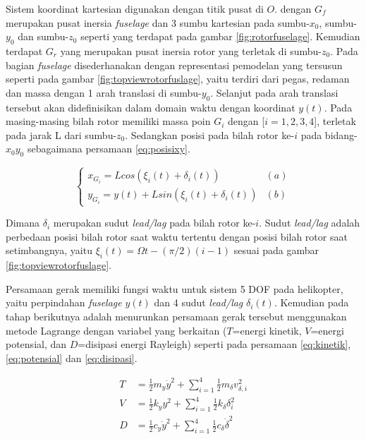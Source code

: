 Sistem koordinat kartesian digunakan dengan titik pusat di $O$. dengan $G_f$ merupakan pusat inersia \textit{fuselage} dan 3 sumbu kartesian pada sumbu-$x_0$, sumbu-$y_0$ dan sumbu-$z_0$ seperti yang terdapat pada gambar \ref{fig:rotorfuselage}. Kemudian terdapat $G_r$ yang merupakan pusat inersia rotor yang terletak di sumbu-$z_0$. Pada bagian \textit{fuselage} disederhanakan dengan representasi pemodelan yang tersusun seperti pada gambar \ref{fig:topviewrotorfuslage}, yaitu terdiri dari pegas, redaman dan massa dengan 1 arah translasi di sumbu-$y_0$. Selanjut pada arah translasi tersebut akan didefinisikan dalam domain waktu dengan koordinat $y(t)$. Pada masing-masing bilah rotor memiliki massa poin $G_i$ dengan [$i=1,2,3,4$], terletak pada jarak L dari sumbu-$z_0$. Sedangkan posisi pada bilah rotor ke-$i$ pada bidang-$x_0y_0$ sebagaimana persamaan \ref{eq:posisixy}.

\begin{equation}
\begin{cases}
x_{G_i} = L cos(\xi_i(t)+\delta_i(t))&(a) \\ 
y_{G_i} = y(t) + L sin(\xi_i(t)+\delta_i(t))&(b)
\end{cases}
\label{eq:posisixy}
\end{equation}

Dimana $\delta_i$ merupakan sudut \textit{lead/lag} pada bilah rotor ke-$i$. Sudut \textit{lead/lag} adalah perbedaan posisi bilah rotor saat waktu tertentu dengan posisi bilah rotor saat setimbangnya, yaitu $\xi_i(t)=\Omega t-(\pi/2)(i-1)$ sesuai pada gambar \ref{fig:topviewrotorfuslage}.

Persamaan gerak memiliki fungsi waktu untuk sistem 5 DOF pada helikopter, yaitu perpindahan \textit{fuselage} $y(t)$ dan 4 sudut \textit{lead/lag} $\delta_i(t)$. Kemudian pada tahap berikutnya adalah menurunkan persamaan gerak tersebut menggunakan metode Lagrange dengan variabel yang berkaitan ($T$=energi kinetik, $V$=energi potensial, dan $D$=disipasi energi Rayleigh) seperti pada persamaan \ref{eq:kinetik}, \ref{eq:potensial} dan \ref{eq:disipasi}.

\begin{align}
T &= \frac{1}{2}m_y\dot{y}^2 + \sum_{i=1}^{4}\frac{1}{2} m_{\delta} v^2_{\delta,i}
\label{eq:kinetik}
\\
V &= \frac{1}{2}k_yy^2+\sum_{i=1}^{4}\frac{1}{2}k_\delta \delta_i^2
\label{eq:potensial}
\\
D &= \frac{1}{2}c_y\dot{y}^2+\sum_{i=1}^{4}\frac{1}{2}c_\delta \dot{\delta}^2
\label{eq:disipasi}
\end{align}

